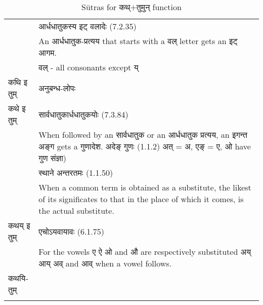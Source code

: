 \begin{longtable}{ |p{2cm}|p{14cm}| }
			\rowcolor{green!10}
			&\texthindi{आर्धधातुकस्य इट् वलादेः} (7.2.35)\\
			\rowcolor{green!10}
			&An \texthindi{आर्धधातुक-प्रत्यय} that starts with a \texthindi{वल्} letter gets an \texthindi{इट् आगम}. \\
			\rowcolor{green!10}
			\multirow{-1}{*}{\texthindi{कथि इट् तुम्}}
			& \texthindi{वल्} - all consonants except \texthindi{य्}
			\\\hline
			\rowcolor{green!10}
			\texthindi{कथि} \texthindi{इ} \texthindi{तुम्}
			&\texthindi{अनुबन्ध-लोपः}
			\\\hline
			\rowcolor{yellow!10}
			\texthindi{कथे} \texthindi{इ} \texthindi{तुम्}&
			\texthindi{सार्वधातुकार्धधातुकयोः} (7.3.84)\\
			\rowcolor{yellow!10}
			&When followed by an \texthindi{सार्वधातुक} or an \texthindi{आर्धधातुक प्रत्यय}, an \texthindi{इगन्त अङ्ग} gets a \texthindi{गुणादेश}.
			\texthindi{अदेङ् गुणः} (1.1.2) \texthindi{अत्} = \texthindi{अ}, \texthindi{एङ्} = \texthindi{ए}, \texthindi{ओ} have \texthindi{गुण संज्ञा})
			\\\hline
			\rowcolor{yellow!10}
			&\texthindi{स्थाने अन्तरतमः} (1.1.50)\\
			\rowcolor{yellow!10}
			&When a common term is obtained as a substitute, the likest of its significates to that in the place of which it comes, is the actual substitute.
			\\\hline
			\rowcolor{yellow!10}
			\texthindi{कथय्} \texthindi{इ} \texthindi{तुम्}&
			\texthindi{एचोऽयवायावः} (6.1.75)\\
			
			\rowcolor{yellow!10}
			&For the vowels \texthindi{ए ऐ ओ} and \texthindi{औ} are respectively substituted \texthindi{अय् आय् अव्} and \texthindi{आव्} when a vowel follows.
			\\\hline
			\rowcolor{yellow!10}
			\texthindi{कथयितुम्}&	 \\\hline
		
		\caption{Sūtras for \texthindi{कथ्$+$तुमुन्} function}
		\label{table:a9}
		\end{longtable}

